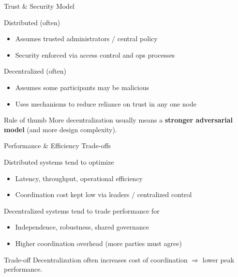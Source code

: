 \begin{frame}{Trust \& Security Model}
  \begin{block}{Distributed (often)}
    \begin{itemize}
      \item Assumes trusted administrators / central policy
      \item Security enforced via access control and ops processes
    \end{itemize}
  \end{block}

  \begin{block}{Decentralized (often)}
    \begin{itemize}
      \item Assumes some participants may be malicious
      \item Uses mechanisms to reduce reliance on trust in any one node
    \end{itemize}
  \end{block}

  \begin{exampleblock}{Rule of thumb}
    More decentralization usually means a \textbf{stronger adversarial model} (and more design complexity).
  \end{exampleblock}
\end{frame}

\begin{frame}{Performance \& Efficiency Trade-offs}
  \begin{block}{Distributed systems tend to optimize}
    \begin{itemize}
      \item Latency, throughput, operational efficiency
      \item Coordination cost kept low via leaders / centralized control
    \end{itemize}
  \end{block}

  \begin{block}{Decentralized systems tend to trade performance for}
    \begin{itemize}
      \item Independence, robustness, shared governance
      \item Higher coordination overhead (more parties must agree)
    \end{itemize}
  \end{block}

  \begin{alertblock}{Trade-off}
    Decentralization often increases cost of coordination $\Rightarrow$ lower peak performance.
  \end{alertblock}
\end{frame}

